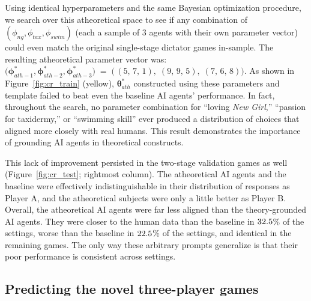 \documentclass[11pt]{article}
\theoremstyle{definition}
\newcommand{\aisub}{AI agent}
\newcommand{\persona}{prompt}
\begin{document}
Using identical hyperparameters and the same Bayesian optimization procedure, we search over this atheoretical space to see if any combination of $(\phi_{ng}, \phi_{tax}, \phi_{swim})$ (each a sample of 3 agents with their own parameter vector) could even match the original single-stage dictator games in-sample.  
The resulting atheoretical parameter vector was: $\bigl(\bm{\phi}_{ath-1}^*,\bm{\phi}_{ath-2}^*,\bm{\phi}_{ath-3}^*\bigr) \;=\; \bigl(\,(5,\,7,\,1),\;(9,\,9,\,5),\;(7,\,6,\,8)\bigr)$.
As shown in Figure~\ref{fig:cr_train} (yellow), $\bm{\theta}_{ath}^*$ constructed using these parameters and template failed to beat even the baseline \aisub{s}' performance.  
In fact, throughout the search, no parameter combination for ``loving \emph{New Girl},'' ``passion for taxidermy,'' or ``swimming skill'' ever produced a distribution of choices that aligned more closely with real humans.
This result demonstrates the importance of grounding \aisub{s} in theoretical constructs.

This lack of improvement persisted in the two-stage validation games as well (Figure~\ref{fig:cr_test}; rightmost column).  
The atheoretical \aisub{s} and the baseline were effectively indistinguishable in their distribution of responses as Player A, and the atheoretical subjects were only a little better as Player B.
Overall, the atheoretical \aisub{s} were far less aligned than the theory-grounded \aisub{s}. 
They were closer to the human data than the baseline in $32.5$\% of the settings, worse than the baseline in $22.5$\% of the settings, and identical in the remaining games.
The only way these arbitrary \persona{s} generalize is that their poor performance is consistent across settings.

\subsection{Predicting the novel three-player games}
\label{sec:cr_novel}
\end{document}
